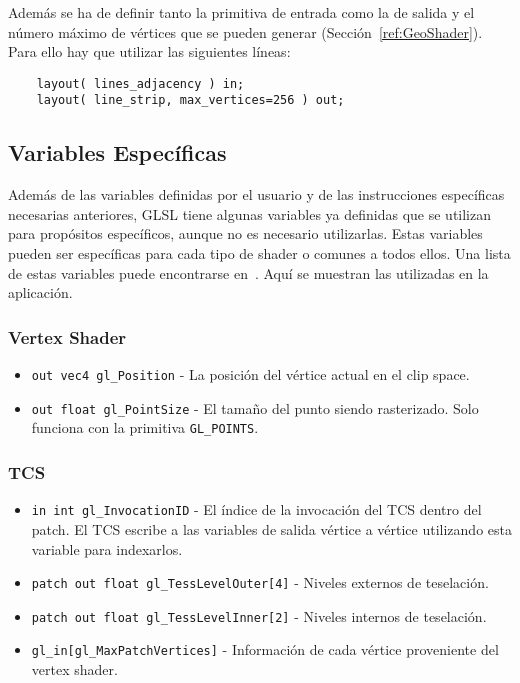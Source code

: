 Además se ha de definir tanto la primitiva de entrada como la de salida y el
número máximo de vértices que se pueden generar (Sección~\ref{ref:GeoShader}).
Para ello hay que utilizar las siguientes líneas:

\begin{verbatim}
    layout( lines_adjacency ) in;
    layout( line_strip, max_vertices=256 ) out;
\end{verbatim}

\subsection{Variables Específicas}

Además de las variables definidas por el usuario y de las instrucciones
específicas necesarias anteriores, GLSL tiene algunas variables ya definidas que
se utilizan para propósitos específicos, aunque no es necesario utilizarlas.
Estas variables pueden ser específicas para cada tipo de shader o comunes a
todos ellos. Una lista de estas variables puede encontrarse
en~\citet{GLSLreference}. Aquí se muestran las utilizadas en la aplicación.

\subsubsection{Vertex Shader}

\begin{itemize}
		\item \verb|out vec4 gl_Position| - La posición del vértice actual en el
				clip space.
		\item \verb|out float gl_PointSize| - El tamaño del punto siendo
				rasterizado. Solo funciona con la primitiva \verb|GL_POINTS|.
\end{itemize}

\subsubsection{TCS}

\begin{itemize}
		\item \verb|in int gl_InvocationID| - El índice de la invocación del TCS
				dentro del patch. El TCS escribe a las variables de salida
				vértice a vértice utilizando esta variable para indexarlos.
		\item \verb|patch out float gl_TessLevelOuter[4]| - Niveles externos de
				teselación.
		\item \verb|patch out float gl_TessLevelInner[2]| - Niveles internos de
				teselación.
		\item \verb|gl_in[gl_MaxPatchVertices]| - Información de cada vértice
				proveniente del vertex shader.
\end{itemize}

